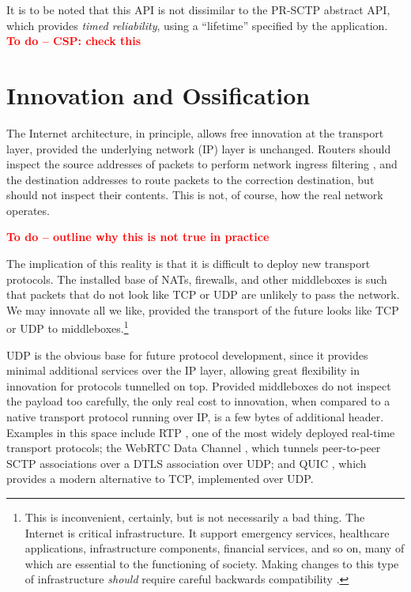 \documentclass{sig-alternate-05-2015}
\newcommand{\todo}[1]{\textbf{\textcolor{red}{To do -- #1}}}
\begin{document}
It is to be noted that this API is not dissimilar to the PR-SCTP abstract
API, which provides \textit{timed reliability}, using a ``lifetime''
specified by the application. \todo{CSP: check this}

\section{Innovation and Ossification}
\label{sec:ossification}

The Internet architecture, in principle, allows free innovation at the
transport layer, provided the underlying network (IP) layer is unchanged.  
Routers should inspect the source addresses of packets to perform network
ingress filtering \cite{rfc:2827}, and the destination addresses to route
packets to the correction destination, but should not inspect their
contents. This is not, of course, how the real network operates. 

\todo{outline why this is not true in practice}

The implication of this reality is that it is difficult to deploy new 
transport protocols. The installed base of NATs, firewalls, and other
middleboxes is such that packets that do not look like TCP or UDP are
unlikely to pass the network. We may innovate all we like, provided the
transport of the future looks like TCP or UDP to middleboxes.\footnote{
  This is inconvenient, certainly, but is not necessarily a bad thing. 
  The Internet is critical infrastructure. It support emergency services, 
  healthcare applications, infrastructure components, financial services, 
  and so on, many of which are essential to the functioning of society. 
  Making changes to this type of infrastructure \emph{should} require 
  careful backwards compatibility \cite{mcquistin:2015:reinterpreting}.
}

UDP is the obvious base for future protocol development, since it provides
minimal additional services over the IP layer, allowing great flexibility
in innovation for protocols tunnelled on top. Provided middleboxes do not
inspect the payload too carefully, the only real cost to innovation, when
compared to a native transport protocol running over IP, is a few bytes of
additional header. Examples in this space include RTP \cite{rfc:3550}, one
of the most widely deployed real-time transport protocols; the WebRTC Data
Channel \cite{draft-ietf-rtcweb-data-channel-13}, which tunnels
peer-to-peer SCTP associations over a DTLS association over UDP; and QUIC
\cite{draft-tsvwg-quic-protocol-02}, which provides a modern alternative 
to TCP, implemented over UDP. 
\end{document}
